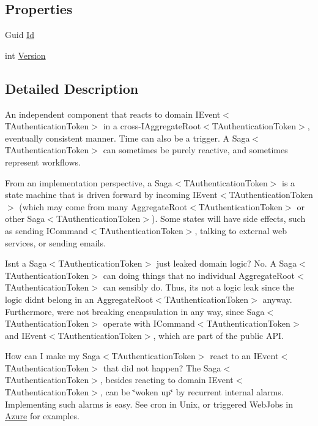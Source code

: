 \subsection*{Properties}
\begin{DoxyCompactItemize}
\item 
Guid \hyperlink{interfaceCqrs_1_1Domain_1_1ISaga_aa470a39d3bcdc506dbd5bf49d127bc3c_aa470a39d3bcdc506dbd5bf49d127bc3c}{Id}
\item 
int \hyperlink{interfaceCqrs_1_1Domain_1_1ISaga_a83a02ff45543d670356dde4149cdc614_a83a02ff45543d670356dde4149cdc614}{Version}
\end{DoxyCompactItemize}


\subsection{Detailed Description}
An independent component that reacts to domain I\+Event$<$\+T\+Authentication\+Token$>$ in a cross-\/I\+Aggregate\+Root$<$\+T\+Authentication\+Token$>$, eventually consistent manner. Time can also be a trigger. A Saga$<$\+T\+Authentication\+Token$>$ can sometimes be purely reactive, and sometimes represent workflows. 

From an implementation perspective, a Saga$<$\+T\+Authentication\+Token$>$ is a state machine that is driven forward by incoming I\+Event$<$\+T\+Authentication\+Token$>$ (which may come from many Aggregate\+Root$<$\+T\+Authentication\+Token$>$ or other Saga$<$\+T\+Authentication\+Token$>$). Some states will have side effects, such as sending I\+Command$<$\+T\+Authentication\+Token$>$, talking to external web services, or sending emails. 

Isn\textquotesingle{}t a Saga$<$\+T\+Authentication\+Token$>$ just leaked domain logic? No. A Saga$<$\+T\+Authentication\+Token$>$ can doing things that no individual Aggregate\+Root$<$\+T\+Authentication\+Token$>$ can sensibly do. Thus, it\textquotesingle{}s not a logic leak since the logic didn\textquotesingle{}t belong in an Aggregate\+Root$<$\+T\+Authentication\+Token$>$ anyway. Furthermore, we\textquotesingle{}re not breaking encapsulation in any way, since Saga$<$\+T\+Authentication\+Token$>$ operate with I\+Command$<$\+T\+Authentication\+Token$>$ and I\+Event$<$\+T\+Authentication\+Token$>$, which are part of the public A\+PI.

How can I make my Saga$<$\+T\+Authentication\+Token$>$ react to an I\+Event$<$\+T\+Authentication\+Token$>$ that did not happen? The Saga$<$\+T\+Authentication\+Token$>$, besides reacting to domain I\+Event$<$\+T\+Authentication\+Token$>$, can be \char`\"{}woken up\char`\"{} by recurrent internal alarms. Implementing such alarms is easy. See cron in Unix, or triggered Web\+Jobs in \hyperlink{namespaceCqrs_1_1Azure}{Azure} for examples.


